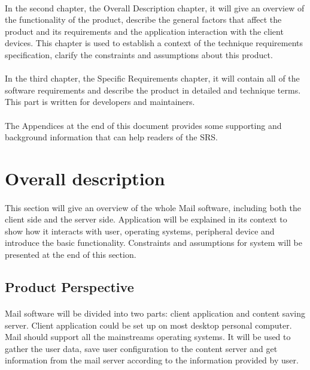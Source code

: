 \documentclass[11pt,a4paper]{article}
\begin{document}
            \paragraph{} In the second chapter, the Overall Description chapter, it will give an overview of the functionality of the product, describe the general factors that affect the product and its requirements and the application interaction with the client devices. This chapter is used to establish a context of the technique requirements specification, clarify the constraints and assumptions about this product.
            \paragraph{} In the third chapter, the Specific Requirements chapter, it will contain all of the software requirements and describe the product in detailed and technique terms. This part is written for developers and maintainers.
            \paragraph{} The Appendices at the end of this document provides some supporting and background information that can help readers of the SRS.
    \clearpage
    \section{Overall description}
        \paragraph{} This section will give an overview of the whole Mail software, including both the client side and the server side. Application will be explained in its context to show how it interacts with user, operating systems, peripheral device and introduce the basic functionality. Constraints and assumptions for system will be presented at the end of this section.
        \subsection{Product Perspective}
            \paragraph{} Mail software will be divided into two parts: client application and content saving server. Client application could be set up on most desktop personal computer. Mail should support all the mainstreams operating systems. It will be used to gather the user data, save user configuration to the content server and get information from the mail server according to the information provided by user.
\end{document}
